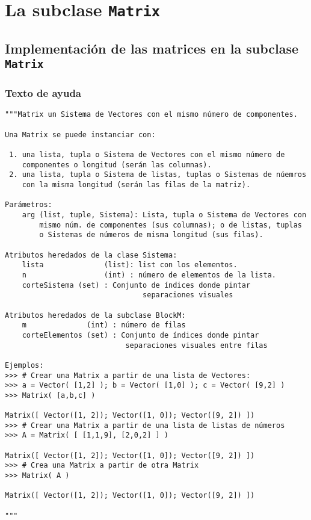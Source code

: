 \documentclass[11pt]{report}
\begin{document}
\chapter{La subclase \texttt{Matrix}}
\label{sec:org1d53da2}

\section{Implementación de las matrices en la subclase \texttt{Matrix}}
\label{sec:org11c136b}

\subsection{Texto de ayuda}
\label{sec:orgfe9b858}

\begin{verbatim}
"""Matrix un Sistema de Vectores con el mismo número de componentes.

Una Matrix se puede instanciar con:

 1. una lista, tupla o Sistema de Vectores con el mismo número de
    componentes o longitud (serán las columnas).
 2. una lista, tupla o Sistema de listas, tuplas o Sistemas de núemros
    con la misma longitud (serán las filas de la matriz).

Parámetros:
    arg (list, tuple, Sistema): Lista, tupla o Sistema de Vectores con
        mismo núm. de componentes (sus columnas); o de listas, tuplas
        o Sistemas de números de misma longitud (sus filas).

Atributos heredados de la clase Sistema:
    lista              (list): list con los elementos.
    n                  (int) : número de elementos de la lista.
    corteSistema (set) : Conjunto de índices donde pintar
                                separaciones visuales

Atributos heredados de la subclase BlockM:
    m              (int) : número de filas
    corteElementos (set) : Conjunto de índices donde pintar
                            separaciones visuales entre filas

Ejemplos:
>>> # Crear una Matrix a partir de una lista de Vectores:
>>> a = Vector( [1,2] ); b = Vector( [1,0] ); c = Vector( [9,2] )
>>> Matrix( [a,b,c] )

Matrix([ Vector([1, 2]); Vector([1, 0]); Vector([9, 2]) ])
>>> # Crear una Matrix a partir de una lista de listas de números
>>> A = Matrix( [ [1,1,9], [2,0,2] ] )

Matrix([ Vector([1, 2]); Vector([1, 0]); Vector([9, 2]) ])
>>> # Crea una Matrix a partir de otra Matrix
>>> Matrix( A )

Matrix([ Vector([1, 2]); Vector([1, 0]); Vector([9, 2]) ])

"""
\end{verbatim}
\end{document}
